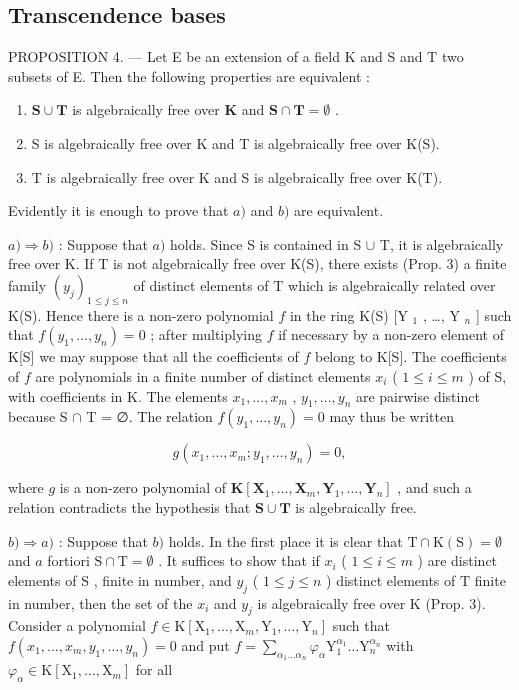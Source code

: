 \subsection{Transcendence bases}

PROPOSITION 4. --- Let E be an extension of a field K and S and T two subsets of E. Then the following properties are equivalent :

\begin{enumerate}
\def\labelenumi{\alph{enumi})}
\item
  \(\mathbf{S} \cup \mathbf{T}\) is algebraically free over \(\mathbf{K}\) and \(\mathbf{S} \cap \mathbf{T} = \emptyset\) .
\item
  S is algebraically free over K and T is algebraically free over K(S).
\item
  T is algebraically free over K and S is algebraically free over K(T).
\end{enumerate}

Evidently it is enough to prove that \(a)\) and \(b)\) are equivalent.

\(a) \Rightarrow b)\) : Suppose that \(a)\) holds. Since S is contained in S \(\cup\) T, it is algebraically free over K. If T is not algebraically free over K(S), there exists (Prop. 3) a finite family \((y_j)_{1 \leq j \leq n}\) of distinct elements of T which is algebraically related over K(S). Hence there is a non-zero polynomial \(f\) in the ring K(S) {[}Y \(_1\) , \ldots, Y \(_n\) {]} such that \(f(y_1, ..., y_n) = 0\) ; after multiplying \(f\) if necessary by a non-zero element of K{[}S{]} we may suppose that all the coefficients of \(f\) belong to K{[}S{]}. The coefficients of \(f\) are polynomials in a finite number of distinct elements \(x_i\) ( \(1 \leq i \leq m\) ) of S, with coefficients in K. The elements \(x_1, ..., x_m\) , \(y_1, ..., y_n\) are pairwise distinct because S \(\cap\) T = ∅. The relation \(f(y_1, ..., y_n) = 0\) may thus be written

\[
g \left(x _ {1}, \dots , x _ {m}; y _ {1}, \dots , y _ {n}\right) = 0,
\]

where \(g\) is a non-zero polynomial of \(\mathbf{K}[\mathbf{X}_1, \ldots, \mathbf{X}_m, \mathbf{Y}_1, \ldots, \mathbf{Y}_n]\) , and such a relation contradicts the hypothesis that \(\mathbf{S} \cup \mathbf{T}\) is algebraically free.

\(b) \Rightarrow a)\) : Suppose that \(b)\) holds. In the first place it is clear that \(\mathrm{T} \cap \mathrm{K}(\mathrm{S}) = \emptyset\) and \(a\) fortiori \(\mathrm{S} \cap \mathrm{T} = \emptyset\) . It suffices to show that if \(x_i\) ( \(1 \leqslant i \leqslant m\) ) are distinct elements of \(\mathrm{S}\) , finite in number, and \(y_j\) ( \(1 \leqslant j \leqslant n\) ) distinct elements of \(\mathrm{T}\) finite in number, then the set of the \(x_i\) and \(y_j\) is algebraically free over \(\mathrm{K}\) (Prop. 3). Consider a polynomial \(f \in \mathrm{K}[\mathrm{X}_1, \ldots, \mathrm{X}_m, \mathrm{Y}_1, \ldots, \mathrm{Y}_n]\) such that \(f(x_1, \ldots, x_m, y_1, \ldots, y_n) = 0\) and put \(f = \sum_{\alpha_1 \ldots \alpha_n} \varphi_\alpha \mathrm{Y}_1^{\alpha_1} \ldots \mathrm{Y}_n^{\alpha_n}\) with \(\varphi_\alpha \in \mathrm{K}[\mathrm{X}_1, \ldots, \mathrm{X}_m]\) for all

